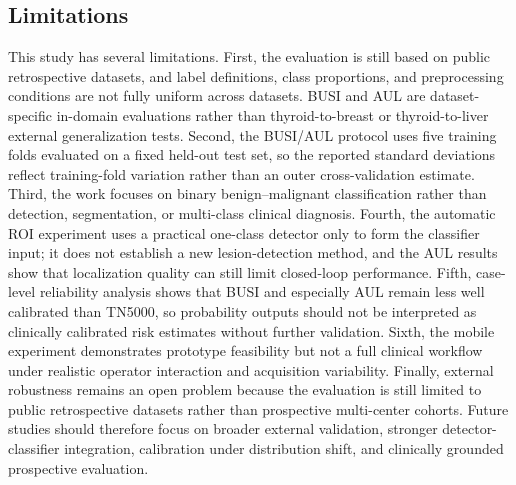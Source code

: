 \subsection*{Limitations}
This study has several limitations. First, the evaluation is still based on public retrospective datasets, and label definitions, class proportions, and preprocessing conditions are not fully uniform across datasets. BUSI and AUL are dataset-specific in-domain evaluations rather than thyroid-to-breast or thyroid-to-liver external generalization tests. Second, the BUSI/AUL protocol uses five training folds evaluated on a fixed held-out test set, so the reported standard deviations reflect training-fold variation rather than an outer cross-validation estimate. Third, the work focuses on binary benign--malignant classification rather than detection, segmentation, or multi-class clinical diagnosis. Fourth, the automatic ROI experiment uses a practical one-class detector only to form the classifier input; it does not establish a new lesion-detection method, and the AUL results show that localization quality can still limit closed-loop performance. Fifth, case-level reliability analysis shows that BUSI and especially AUL remain less well calibrated than TN5000, so probability outputs should not be interpreted as clinically calibrated risk estimates without further validation. Sixth, the mobile experiment demonstrates prototype feasibility but not a full clinical workflow under realistic operator interaction and acquisition variability. Finally, external robustness remains an open problem because the evaluation is still limited to public retrospective datasets rather than prospective multi-center cohorts. Future studies should therefore focus on broader external validation, stronger detector-classifier integration, calibration under distribution shift, and clinically grounded prospective evaluation.
